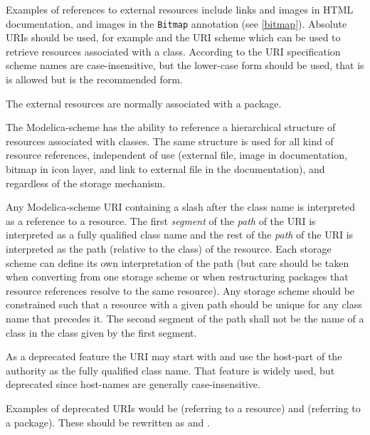Examples of references to external resources include links and images in HTML documentation, and images in the \lstinline!Bitmap! annotation (see \cref{bitmap}).
Absolute URIs should be used, for example  and the URI scheme  which can be used to retrieve resources associated with a class.
According to the URI specification scheme names are case-insensitive, but the lower-case form should be used, that is  is allowed but  is the recommended form.

\begin{nonnormative}
The external resources are normally associated with a package.
\end{nonnormative}

The Modelica-scheme has the ability to reference a hierarchical structure of resources associated with classes.
The same structure is used for all kind of resource references, independent of use (external file, image in documentation, bitmap in icon layer, and link to external file in the documentation), and regardless of the storage mechanism.

Any Modelica-scheme URI containing a slash after the class name is interpreted as a reference to a resource.
The first \emph{segment} of the \emph{path} of the URI is interpreted as a fully qualified class name and the rest of the \emph{path} of the URI is interpreted as the path (relative to the class) of the resource.
Each storage scheme can define its own interpretation of the path (but care should be taken when converting from one storage scheme or when restructuring packages that resource references resolve to the same resource).
Any storage scheme should be constrained such that a resource with a given path should be unique for any class name that precedes it.
The second segment of the path shall not be the name of a class in the class given by the first segment.

As a deprecated feature the URI may start with  and use the host-part of the authority as the fully qualified class name.
That feature is widely used, but deprecated since host-names are generally case-insensitive.
\begin{nonnormative}
Examples of deprecated URIs would be  (referring to a resource) and  (referring to a package).
These should be rewritten as  and .
\end{nonnormative}

